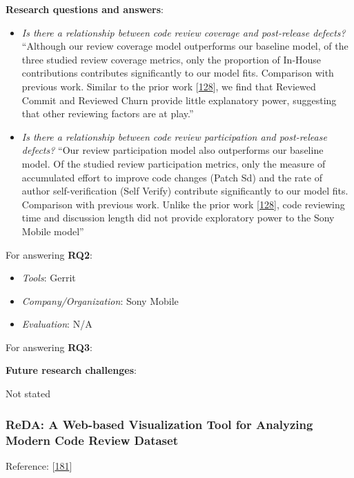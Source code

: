 \documentclass[]{book}
\providecommand{\tightlist}{%
  \setlength{\itemsep}{0pt}\setlength{\parskip}{0pt}}
\begin{document}
\textbf{Research questions and answers}:

\begin{itemize}
\item
  \emph{Is there a relationship between code review coverage and
  post-release defects?} ``Although our review coverage model
  outperforms our baseline model, of the three studied review coverage
  metrics, only the proportion of In-House contributions contributes
  significantly to our model fits. Comparison with previous work.
  Similar to the prior work
  {[}\protect\hyperlink{ref-mcintosh2016empirical}{128}{]}, we find that
  Reviewed Commit and Reviewed Churn provide little explanatory power,
  suggesting that other reviewing factors are at play.''
\item
  \emph{Is there a relationship between code review participation and
  post-release defects?} ``Our review participation model also
  outperforms our baseline model. Of the studied review participation
  metrics, only the measure of accumulated effort to improve code
  changes (Patch Sd) and the rate of author self-verification (Self
  Verify) contribute significantly to our model fits. Comparison with
  previous work. Unlike the prior work
  {[}\protect\hyperlink{ref-mcintosh2016empirical}{128}{]}, code
  reviewing time and discussion length did not provide exploratory power
  to the Sony Mobile model''
\end{itemize}

For answering \textbf{RQ2}:

\begin{itemize}
\tightlist
\item
  \emph{Tools}: Gerrit
\item
  \emph{Company/Organization}: Sony Mobile
\item
  \emph{Evaluation}: N/A
\end{itemize}

For answering \textbf{RQ3}:

\textbf{Future research challenges}:

Not stated

\subsubsection{ReDA: A Web-based Visualization Tool for Analyzing Modern
Code Review
Dataset}\label{reda-a-web-based-visualization-tool-for-analyzing-modern-code-review-dataset}

Reference: {[}\protect\hyperlink{ref-thongtanunam2014reda}{181}{]}
\end{document}
